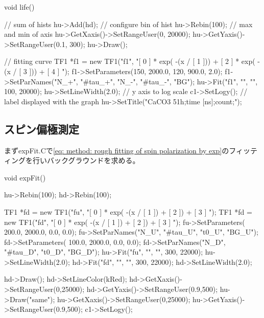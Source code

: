 \documentclass[dvipdfmx]{jsarticle}
\begin{document}
\begin{mylisting}[language=c++, caption=life.C]
void life()
{
    // sum of hists
    hu->Add(hd);
    // configure bin of hist
    hu->Rebin(100);
    // max and min of axis
    hu->GetXaxis()->SetRangeUser(0, 20000);
    hu->GetYaxis()->SetRangeUser(0.1, 300);
    hu->Draw();

    // fitting curve
    TF1 *f1 = new TF1("f1", "[ 0 ] * exp( -(x / [ 1 ])) + [ 2 ] * exp( -(x / [ 3 ])) +  [ 4 ] ");
    f1->SetParameters(150, 2000.0, 120, 900.0, 2.0);
    f1->SetParNames("N_{+}", "#tau_{+}", "N_{-}", "#tau_{-}", "BG");
    hu->Fit("f1", "", "", 100, 20000);
    hu->SetLineWidth(2.0);
    // y axis to log scale
    c1->SetLogy();
    // label displayed with the graph
    hu->SetTitle("CaCO3 51h;time [ns];count;");
}
\end{mylisting}

\subsection{スピン偏極測定}
まずexpFit.Cで\eqref{eq: method: rough fitting of spin polarization by exp}のフィッティングを行いバックグラウンドを求める。

\begin{mylisting}[language=c++,caption=expFit.C]
void expFit()
{
    hu->Rebin(100);
    hd->Rebin(100);

    TF1 *fd = new TF1("fu", "[ 0 ] * exp( -(x / [ 1 ]) + [ 2 ]) +  [ 3 ] ");
    TF1 *fd = new TF1("fd", "[ 0 ] * exp( -(x / [ 1 ]) + [ 2 ]) +  [ 3 ] ");
    fu->SetParameters( 200.0, 2000.0, 0.0, 0.0);
    fu->SetParNames("N_U", "#tau_U", "t0_U", "BG_U");
    fd->SetParameters( 100.0, 2000.0, 0.0, 0.0);
    fd->SetParNames("N_D", "#tau_D", "t0_D", "BG_D");
    hu->Fit("fu", "", "", 300, 22000);
    hu->SetLineWidth(2.0);
    hd->Fit("fd", "", "", 300, 22000);
    hd->SetLineWidth(2.0);

    hd->Draw();
    hd->SetLineColor(kRed);
    hd->GetXaxis()->SetRangeUser(0,25000);
    hd->GetYaxis()->SetRangeUser(0.9,500);
    hu->Draw("same");
    hu->GetXaxis()->SetRangeUser(0,25000);
    hu->GetYaxis()->SetRangeUser(0.9,500);
    c1->SetLogy();
}
\end{mylisting}
\end{document}
